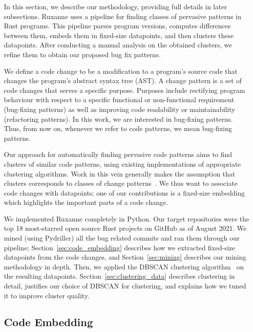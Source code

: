 In this section, we describe our methodology, providing full details in later subsections. Ruxanne uses a pipeline for finding classes of pervasive patterns in Rust programs. This pipeline parses program versions, computes differences between them, embeds them in fixed-size datapoints, and then clusters these datapoints. After conducting a manual analysis on the obtained clusters, we refine them to obtain our proposed bug fix patterns.

We define a code change to be a modification to a program's source code that changes the program's abstract syntax tree (AST). A change pattern is a set of code changes that serves a specific purpose. Purposes include rectifying program behaviour with respect to a specific functional or non-functional requirement (bug-fixing patterns) as well as improving code readability or maintainability (refactoring patterns). In this work, we are interested in bug-fixing patterns. Thus, from now on, whenever we refer to code patterns, we mean bug-fixing patterns.

Our approach for automatically finding pervasive code patterns aims to find clusters of similar code patterns, using existing implementations of appropriate clustering algorithms. Work in this vein generally makes the assumption that clusters corresponds to classes of change patterns~\citep{hanam2016discovering,campos2019discovering,yang2022mining}. We thus want to associate code changes with datapoints; one of our contributions is a fixed-size embedding which highlights the important parts of a code change.


We implemented Ruxanne completely in Python. Our target repositories were the top 18 most-starred open source Rust projects on GitHub as of August 2021. We mined (using Pydriller) all the bug related commits and ran them through our pipeline; Section~\ref{sec:code_embedding} describes how we extracted fixed-size datapoints from the code changes, and Section~\ref{sec:mining} describes our mining methodology in depth. Then, we applied the DBSCAN clustering algorithm~\citep{ester1996density} on the resulting datapoints. Section~\ref{sec:clustering_data} describes clustering in detail, justifies our choice of DBSCAN for clustering, and explains how we tuned it to improve cluster quality. 

\subsection{\label{sec:code_embedding}Code Embedding}

